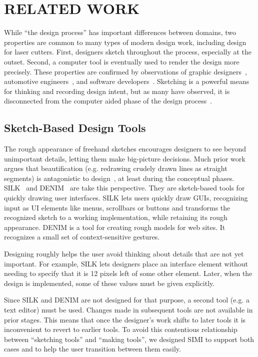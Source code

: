 \documentclass{article}
\begin{document}
\section{RELATED WORK}

While ``the design process'' has important differences between
domains, two properties are common to many types of modern design
work, including design for laser cutters. First, designers sketch
throughout the process, especially at the outset. Second, a computer
tool is eventually used to render the design more precisely. These
properties are confirmed by observations of graphic
designers~\cite{wong-rr-prototypes}, automotive
engineers~\cite{kara-styling}, and software
developers~\cite{dekel-improvised-notation}. Sketching is a powerful
means for thinking and recording design intent, but as many have
observed, it is disconnected from the computer aided phase of the
design process~\cite{company-sketching-in-engineering}.

\subsection{Sketch-Based Design Tools}

The rough appearance of freehand sketches encourages designers to see
beyond unimportant details, letting them make big-picture
decisions. Much prior work argues that beautification (e.g. redrawing
crudely drawn lines as straight segments) is antagonistic to
design~\cite{gross-cocktail}, at least during the conceptual
phases. SILK~\cite{landay-silk-chi} and DENIM~\cite{lin-denim} are
take this perspective. They are sketch-based tools for quickly drawing
user interfaces. SILK lets users quickly draw GUIs, recognizing input
as UI elements like menus, scrollbars or buttons and transforms the
recognized sketch to a working implementation, while retaining its
rough appearance. DENIM is a tool for creating rough models for web
sites. It recognizes a small set of context-sensitive gestures.

Designing roughly helps the user avoid thinking about details that are
not yet important. For example, SILK lets designers place an interface
element without needing to specify that it is 12 pixels left of some
other element. Later, when the design is implemented, some of these
values must be given explicitly. 

Since SILK and DENIM are not designed for that purpose, a second tool
(e.g. a text editor) must be used. Changes made in subsequent tools
are not available in prior stages. This means that once the designer's
work shifts to later tools it is inconvenient to revert to earlier
tools. To avoid this contentious relationship between ``sketching
tools'' and ``making tools'', we designed SIMI to support both cases
and to help the user transition between them easily.
\end{document}
